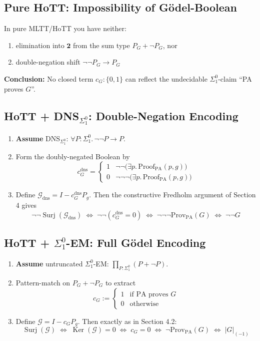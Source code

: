 \documentclass[11pt]{article}
\theoremstyle{definition}
\newcommand{\SigOne}{\Sigma^{0}_{\!1}}
\DeclareMathOperator{\Ker}{Ker}
\DeclareMathOperator{\Surj}{Surj}
\newcommand{\trunc}[1]{\lvert #1\rvert_{(-1)}}
\begin{document}
\subsection{Pure HoTT: Impossibility of Gödel-Boolean}

In pure MLTT/HoTT you have neither:
\begin{enumerate}
\item elimination into $\mathbf{2}$ from the sum type $P_G + \neg P_G$, nor
\item double-negation shift $\neg\neg P_G \to P_G$
\end{enumerate}
\textbf{Conclusion:} No closed term $c_G: \{0,1\}$ can reflect the undecidable $\SigOne$-claim ``PA proves $G$''.

\subsection{HoTT + DNS$_{\SigOne}$: Double-Negation Encoding}

\begin{enumerate}
\item \textbf{Assume} DNS$_{\SigOne}$: $\forall P: \SigOne.\, \neg\neg P \to P$.
\item Form the doubly-negated Boolean by
\[
c_G^{\text{dns}} = \begin{cases}
1 & \neg\neg\bigl(\exists p.\, \mathrm{Proof}_{\mathrm{PA}}(p,g)\bigr) \\
0 & \neg\neg\neg\bigl(\exists p.\, \mathrm{Proof}_{\mathrm{PA}}(p,g)\bigr)
\end{cases}
\]
\item Define $\mathcal{G}_{\text{dns}} = I - c_G^{\text{dns}}P_g$. Then the constructive Fredholm argument of Section 4 gives
\[
\neg\neg\Surj(\mathcal{G}_{\text{dns}}) \;\Longleftrightarrow\; \neg\neg(c_G^{\text{dns}} = 0) \;\Longleftrightarrow\; \neg\neg\neg\mathrm{Prov}_{\mathrm{PA}}(G) \;\Longleftrightarrow\; \neg\neg G
\]
\end{enumerate}

\subsection{HoTT + $\SigOne$-EM: Full Gödel Encoding}

\begin{enumerate}
\item \textbf{Assume} untruncated $\SigOne$-EM: $\displaystyle\prod_{P: \SigOne} (P + \neg P)$.
\item Pattern-match on $P_G + \neg P_G$ to extract
\[
c_G := \begin{cases}
1 & \text{if PA proves } G \\
0 & \text{otherwise}
\end{cases}
\]
\item Define $\mathcal{G} = I - c_G P_g$. Then exactly as in Section 4.2:
\[
\Surj(\mathcal{G}) \;\Longleftrightarrow\; \Ker(\mathcal{G}) = 0 \;\Longleftrightarrow\; c_G = 0 \;\Longleftrightarrow\; \neg\mathrm{Prov}_{\mathrm{PA}}(G) \;\Longleftrightarrow\; \trunc{G}
\]
\end{enumerate}
\end{document}
